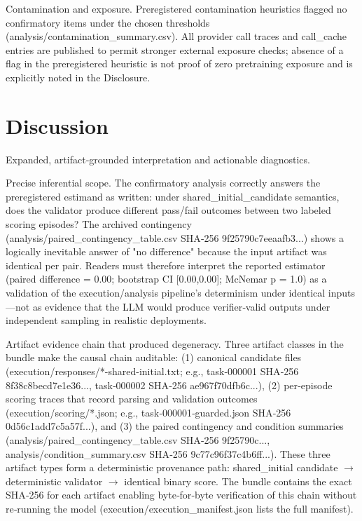 \documentclass[conference]{IEEEtran}
\begin{document}
Contamination and exposure. Preregistered contamination heuristics flagged no confirmatory items under the chosen thresholds (analysis/contamination\_summary.csv). All provider call traces and call\_cache entries are published to permit stronger external exposure checks; absence of a flag in the preregistered heuristic is not proof of zero pretraining exposure and is explicitly noted in the Disclosure.

\section{Discussion}
Expanded, artifact‑grounded interpretation and actionable diagnostics.

Precise inferential scope. The confirmatory analysis correctly answers the preregistered estimand as written: under shared\_initial\_candidate semantics, does the validator produce different pass/fail outcomes between two labeled scoring episodes? The archived contingency (analysis/paired\_contingency\_table.csv SHA‑256 9f25790c7eeaafb3...) shows a logically inevitable answer of "no difference" because the input artifact was identical per pair. Readers must therefore interpret the reported estimator (paired difference = 0.00; bootstrap CI [0.00,0.00]; McNemar p = 1.0) as a validation of the execution/analysis pipeline's determinism under identical inputs---not as evidence that the LLM would produce verifier‑valid outputs under independent sampling in realistic deployments.

Artifact evidence chain that produced degeneracy. Three artifact classes in the bundle make the causal chain auditable: (1) canonical candidate files (execution/responses/*-shared-initial.txt; e.g., task‑000001 SHA‑256 8f38c8becd7e1e36..., task‑000002 SHA‑256 ae967f70dfb6c...), (2) per‑episode scoring traces that record parsing and validation outcomes (execution/scoring/*.json; e.g., task‑000001‑guarded.json SHA‑256 0d56c1add7c5a57f...), and (3) the paired contingency and condition summaries (analysis/paired\_contingency\_table.csv SHA‑256 9f25790c..., analysis/condition\_summary.csv SHA‑256 9c77c96f37c4b6ff...). These three artifact types form a deterministic provenance path: shared\_initial candidate \ensuremath{\rightarrow} deterministic validator \ensuremath{\rightarrow} identical binary score. The bundle contains the exact SHA‑256 for each artifact enabling byte‑for‑byte verification of this chain without re‑running the model (execution/execution\_manifest.json lists the full manifest).
\end{document}
